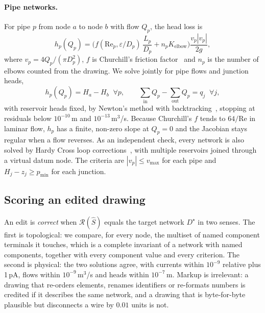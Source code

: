 \paragraph{Pipe networks.} For pipe $p$ from node $a$ to node $b$ with flow $Q_p$, the head loss is
\begin{equation}
h_p(Q_p) = \Big(f(\mathrm{Re}_p,\varepsilon/D_p)\,\frac{L_p}{D_p} + n_p K_\text{elbow}\Big)
\frac{v_p |v_p|}{2g},
\end{equation}
where $v_p = 4Q_p/(\pi D_p^2)$, $f$ is Churchill's friction factor~\cite{churchill1977} and $n_p$ is the number
of elbows counted from the drawing. We solve jointly for pipe flows and junction heads,
\begin{equation}
h_p(Q_p) = H_a - H_b \;\;\forall p, \qquad
\textstyle\sum_{\text{in}} Q_p - \sum_{\text{out}} Q_p = q_j \;\;\forall j,
\end{equation}
with reservoir heads fixed, by Newton's method with backtracking~\cite{todini1988}, stopping at residuals below
$10^{-10}$\,m and $10^{-13}$\,m$^3$/s. Because Churchill's $f$ tends to $64/\mathrm{Re}$ in laminar flow, $h_p$
has a finite, non-zero slope at $Q_p = 0$ and the Jacobian stays regular when a flow reverses. As an independent
check, every network is also solved by Hardy Cross loop corrections~\cite{hardycross1936}, with multiple
reservoirs joined through a virtual datum node. The criteria are $|v_p| \le v_\text{max}$ for each pipe and
$H_j - z_j \ge p_\text{min}$ for each junction.

\subsection{Scoring an edited drawing}
An edit is \emph{correct} when $\mathcal{R}(\hat S)$ equals the target network $D^\star$ in two senses. The
first is topological: we compare, for every node, the multiset of named component terminals it touches, which
is a complete invariant of a network with named components, together with every component value and every
criterion. The second is physical: the two solutions agree, with currents within $10^{-9}$ relative plus
1\,pA, flows within $10^{-9}$\,m$^3$/s and heads within $10^{-7}$\,m. Markup is irrelevant: a drawing that
re-orders elements, renames identifiers or re-formats numbers is credited if it describes the same network,
and a drawing that is byte-for-byte plausible but disconnects a wire by $0.01$ units is not.

